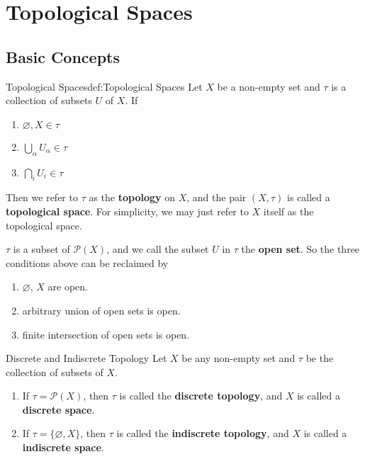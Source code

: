 \section{Topological Spaces}

\subsection{Basic Concepts}\label{sub:Basic Concepts} %

\begin{definition}{Topological Spaces}{def:Topological Spaces}
    Let $X$ be a non-empty set and $\tau$ is a collection of subsets
    $U$ of $X$. If

    \begin{enumerate}

        \item $\varnothing, X \in \tau$
        \item $\bigcup_{\alpha} U_{\alpha} \in \tau$
        \item $\bigcap_{i} U_{i} \in \tau$

    \end{enumerate}
    Then we refer to $\tau$ as the \textbf{topology} on $X$, and the pair
    $(X,\tau)$ is called a \textbf{topological space}. For
    simplicity, we may just refer to $X$ itself as the
    topological space.
\end{definition}

\begin{remarks}
    $\tau$ is a subset of $\mathcal{P}(X)$, and we call the subset
    $U$ in $\tau$ the \textbf{open set}. So the three conditions
    above can be reclaimed by
    \begin{enumerate}
        \item $\varnothing$, $X$ are open.
        \item arbitrary union of open sets is open.
        \item finite intersection of open sets is open.
    \end{enumerate}
\end{remarks}

\begin{definition}{Discrete and Indiscrete Topology}{}
    Let $X$ be any non-empty set and $\tau$ be the collection of
    subsets of $X$.
    \begin{enumerate}

        \item If $\tau = \mathcal{P}(X)$, then $\tau$ is called the
            \textbf{discrete topology}, and $X$ is called a
            \textbf{discrete space}.
        \item If $\tau = \{\varnothing, X\}$, then $\tau$ is called the
            \textbf{indiscrete topology}, and $X$ is called a
            \textbf{indiscrete space}.

    \end{enumerate}
\end{definition}

